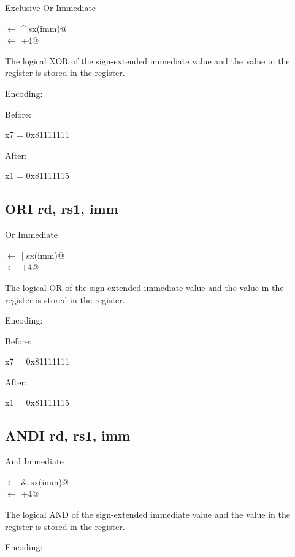 Exclusive Or Immediate

\verb@rd@ $\leftarrow$  ^ sx(imm)@\\
\verb@pc@ $\leftarrow$ \verb@pc+4@

The logical XOR of the sign-extended immediate value and the value 
in the  register is stored in the  register.

Encoding:


Before:

x7 = 0x81111111

After:

x1 = 0x81111115

\subsection{ORI rd, rs1, imm}

Or Immediate

\verb@rd@ $\leftarrow$  | sx(imm)@\\
\verb@pc@ $\leftarrow$ \verb@pc+4@

The logical OR of the sign-extended immediate value and the value 
in the  register is stored in the  register.

Encoding:


Before:

x7 = 0x81111111

After:

x1 = 0x81111115

\subsection{ANDI rd, rs1, imm}

And Immediate

\verb@rd@ $\leftarrow$  & sx(imm)@\\
\verb@pc@ $\leftarrow$ \verb@pc+4@

The logical AND of the sign-extended immediate value and the value 
in the  register is stored in the  register.


Encoding:

